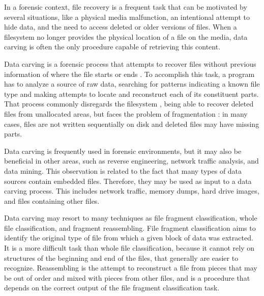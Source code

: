 In a forensic context, file recovery is a frequent task that can be motivated by several situations, like a physical media malfunction, an intentional attempt to hide data, and the need to access deleted or older versions of files. When a filesystem no longer provides the physical location of a file on the media, data carving is often the only procedure capable of retrieving this content.

Data carving is a forensic process that attempts to recover files without previous information of where the file starts or ends \cite{garfinkel_carving_2007}.
To accomplish this task, a program has to analyze a source of raw data, searching for patterns indicating a known file type and making attempts to locate and reconstruct each of its constituent parts.
That process commonly disregards the filesystem \cite{veenman_statistical_2007}, being able to recover deleted files from unallocated areas, but faces the problem of fragmentation \cite{veenman_statistical_2007}  \cite{pal_evolution_2009}: in many cases, files are not written sequentially on disk and deleted files may have missing parts.

Data carving is frequently used in forensic environments, but it may also be beneficial in other areas, such as reverse engineering, network traffic analysis, and data mining.
This observation is related to the fact that many types of data sources contain embedded files. Therefore, they may be used as input to a data carving process. This includes network traffic, memory dumps, hard drive images, and files containing other files.

{\color{red}
Data carving may resort to many techniques as file fragment classification, whole file classification, and fragment reassembling.
File fragment classification aims to identify the original type of file from which a given block of
data was extracted. It is a more difficult task than whole file classification, because it cannot rely on structures of the beginning and end of the files, that generally are easier to recognize. Reassembling is the attempt to reconstruct a file from pieces that may be out of order and mixed with pieces from other files, and is a procedure that depends on the correct output of the file fragment classification task.
}
